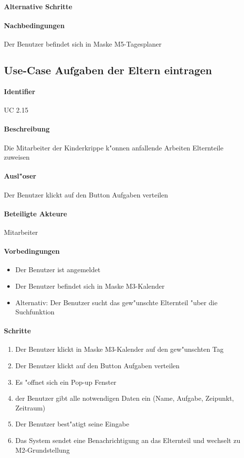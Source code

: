   \paragraph{Alternative Schritte}
  \paragraph{Nachbedingungen}
  Der Benutzer befindet sich in Maske M5-Tagesplaner

 
 \newpage
 \subsection{Use-Case Aufgaben der Eltern eintragen}
  \paragraph{Identifier}
  UC 2.15
  \paragraph{Beschreibung}
  Die Mitarbeiter der Kinderkrippe k"onnen anfallende Arbeiten Elternteile zuweisen
  \paragraph{Ausl"oser}
  Der Benutzer klickt auf den Button \dq Aufgaben verteilen\dq
  \paragraph{Beteiligte Akteure}   \leavevmode \newline
    Mitarbeiter
  \paragraph{Vorbedingungen}
  \begin{itemize}
   \item Der Benutzer ist angemeldet
   \item Der Benutzer befindet sich in Maske M3-Kalender
   \item Alternativ: Der Benutzer sucht das gew"unschte Elternteil "uber die Suchfunktion
  \end{itemize}

  \paragraph{Schritte}
  \begin{enumerate}
  \item Der Benutzer klickt in Maske M3-Kalender auf den gew"unschten Tag
  \item Der Benutzer klickt auf den Button \dq Aufgaben verteilen\dq
  \item Es "offnet sich ein Pop-up Fenster
  \item der Benutzer gibt alle notwendigen Daten ein (Name, Aufgabe, Zeipunkt, Zeitraum)
  \item Der Benutzer best"atigt seine Eingabe
  \item Das System sendet eine Benachrichtigung an das Elternteil und wechselt zu M2-Grundstellung
  \end{enumerate}
  
